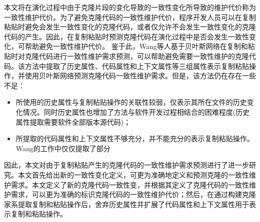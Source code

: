 本文将在演化过程中由于克隆片段的变化导致的一致性变化所导致的维护代价称为一致性维护代价。为了避免克隆代码的一致性维护代价，程序开发人员可以在复制粘贴时避免会发生一致性变化的克隆代码，或者仅允许不会发生一致性变化的克隆代码的产生。因此，在复制粘贴时预测克隆代码在演化过程中是否会发生一致性变化，可帮助避免一致性维护代价。
鉴于此，Wang等人基于贝叶斯网络在复制和粘贴时对克隆代码进行一致性维护需求预测，可以帮助避免需要一致性维护的克隆代码\cite{wang2012can}\cite{wang2014predicting}。该方法中提取了历史属性、代码属性和上下文属性等三组属性表示复制粘贴操作，并使用贝叶斯网络预测克隆代码一致性维护需求。但是，该方法仍在存在一些不足：
\begin{itemize}
\item
所使用的历史属性与复制粘贴操作的关联性较弱，仅表示其所在文件的历史变化情况。同时历史属性也增加了方法与软件开发过程相结合的困难程度(历史属性提取需要软件全部版本源代码)；
\item
所提取的代码属性和上下文属性不够充分，并不能充分的表示复制粘贴操作。Wang的工作中仅仅提取了部分
\end{itemize}


因此，本文对由于复制粘贴产生的克隆代码的一致性维护需求预测进行了进一步研究。本文首先给出新的一致性变化定义，可更为准确地定义和预测克隆的一致性维护需求。本文定义了新的克隆代码一致性变，并根据其定义了克隆代码的一致性维护需求，可以更为准确的标识克隆代码的一致性维护代价；然后，在通过构建克隆家系提取复制和粘贴操作后，舍弃历史属性并扩展了代码属性和上下文属性用于表示复制和粘贴操作。%

